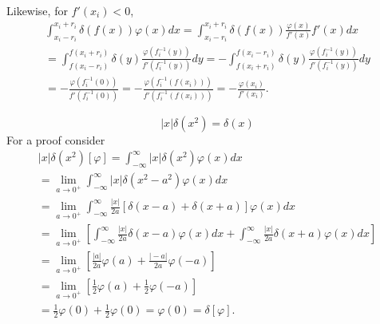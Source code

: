 {\begin{equation}
\end{equation}
Likewise, for  $f'(x_i)<0$,
\begin{equation}
\begin{split}
\int_{x_i-r_i}^{x_i+r_i} \delta (f(x)) \varphi(x) dx
=
\int_{x_i-r_i}^{x_i+r_i} \delta (f(x)) \frac{\varphi(x)}{f'(x)} f'(x)  dx   \\
=
\int_{f(x_i-r_i)}^{f(x_i+r_i)} \delta (y) \frac{\varphi(f_i^{-1} (y))}{f'(f_i^{-1} (y))}   dy
=
- \int_{f(x_i+r_i)}^{f(x_i-r_i)} \delta (y) \frac{\varphi(f_i^{-1} (y))}{f'(f_i^{-1} (y))}   dy  \\
=  - \frac{\varphi(f_i^{-1} (0))}{f'(f_i^{-1} (0))}
=  - \frac{\varphi(f_i^{-1} (f(x_i)))}{f'(f_i^{-1} (f(x_i)))}
=  - \frac{\varphi( x_i)}{f'( x_i )} .
\end{split}
\end{equation}
\eproof
}


 \begin{equation}
 \vert x\vert \delta (x^2)=\delta (x)
 \end{equation}
{\color{OliveGreen}
\bproof
For a proof consider
 \begin{equation}
 \begin{split}
\vert x \vert \delta (x^2)[\varphi ]
=
\int_{-\infty}^{\infty}\vert x \vert \delta (x^2)\varphi (x) dx\\
=
\lim_{a\rightarrow 0^+}
\int_{-\infty}^{\infty}\vert x \vert \delta (x^2-a^2)\varphi (x) dx    \\
=
\lim_{a\rightarrow 0^+}
\int_{-\infty}^{\infty}\frac{\vert x \vert}{2a} \left[ \delta (x -a ) + \delta (x + a )\right] \varphi (x) dx \\
=
\lim_{a\rightarrow 0^+} \left[
\int_{-\infty}^{\infty}\frac{\vert x \vert}{2a}   \delta (x -a ) \varphi (x) dx  +
\int_{-\infty}^{\infty}\frac{\vert x \vert}{2a}  \delta (x + a )\varphi (x) dx \right]  \\
=
\lim_{a\rightarrow 0^+} \left[
 \frac{\vert a \vert}{2a}   \varphi   (a)   +
 \frac{\vert -a \vert}{2a}  \varphi (-a)   \right]  \\
=
\lim_{a\rightarrow 0^+} \left[
 \frac{1}{2 }     \varphi (a)    +
 \frac{1}{2 }  \varphi (-a)   \right]  \\
=
\frac{1}{2 }     \varphi (0)   +
 \frac{1}{2 }  \varphi (0)
= \varphi (0)
=
\delta[\varphi ]
.
 \end{split}
 \end{equation}
\eproof
}

